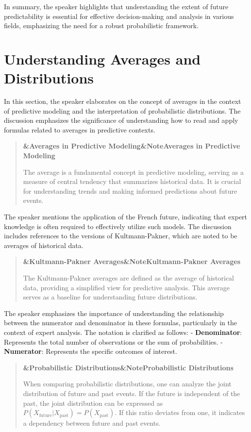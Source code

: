 \documentclass[a4paper]{article}
\newcommand{\boxheading}[1]{%
  \par\smallskip
  \noindent\textbf{\ifx&#1&Note\else#1\fi}\par
  \smallskip
}
\newenvironment{defbox}[1][]{%
  \begin{quote}\color{green!40!black}\boxheading{#1}\normalcolor
}{\end{quote}}
\newenvironment{exbox}[1][]{%
  \begin{quote}\color{brown!70!black}\boxheading{#1}\normalcolor
}{\end{quote}}
\newenvironment{rembox}[1][]{%
  \begin{quote}\color{black!70}\boxheading{#1}\normalcolor
}{\end{quote}}
\begin{document}
In summary, the speaker highlights that understanding the extent of future predictability is essential for effective decision-making and analysis in various fields, emphasizing the need for a robust probabilistic framework.

\section{Understanding Averages and Distributions}
In this section, the speaker elaborates on the concept of averages in the context of predictive modeling and the interpretation of probabilistic distributions. The discussion emphasizes the significance of understanding how to read and apply formulas related to averages in predictive contexts.

\begin{rembox}[Averages in Predictive Modeling]
The average is a fundamental concept in predictive modeling, serving as a measure of central tendency that summarizes historical data. It is crucial for understanding trends and making informed predictions about future events.
\end{rembox}

The speaker mentions the application of the French future, indicating that expert knowledge is often required to effectively utilize such models. The discussion includes references to the versions of Kultmann-Pakner, which are noted to be averages of historical data.

\begin{defbox}[Kultmann-Pakner Averages]
The Kultmann-Pakner averages are defined as the average of historical data, providing a simplified view for predictive analysis. This average serves as a baseline for understanding future distributions.
\end{defbox}

The speaker emphasizes the importance of understanding the relationship between the numerator and denominator in these formulas, particularly in the context of expert analysis. The notation is clarified as follows:
- \textbf{Denominator}: Represents the total number of observations or the sum of probabilities.
- \textbf{Numerator}: Represents the specific outcomes of interest.

\begin{exbox}[Probabilistic Distributions]
When comparing probabilistic distributions, one can analyze the joint distribution of future and past events. If the future is independent of the past, the joint distribution can be expressed as \( P(X_{\text{future}} | X_{\text{past}}) = P(X_{\text{past}}) \). If this ratio deviates from one, it indicates a dependency between future and past events.
\end{exbox}
\end{document}
